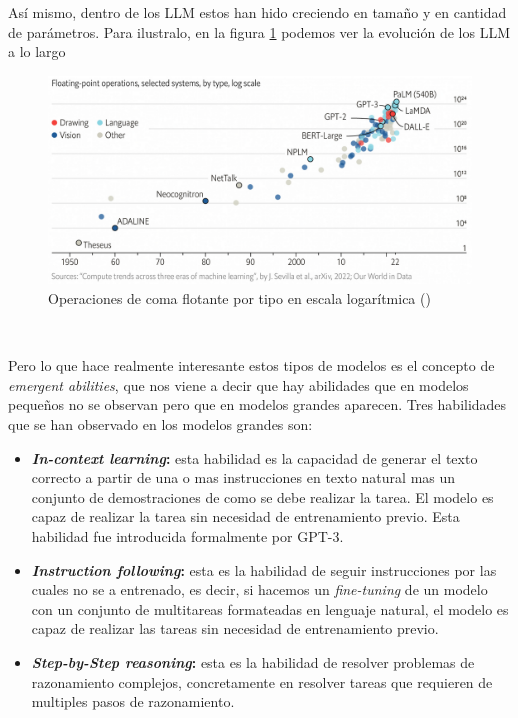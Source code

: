 Así mismo, dentro de los LLM estos han hido creciendo en tamaño y en cantidad de parámetros.
Para ilustralo, en la figura \ref{fig:evolutionLLM} podemos ver la evolución de los LLM a lo largo

\begin{figure}[H]
    \begin{center}
      \includegraphics[width=15cm]{figuras/Capitulo_09/EvolutionLLM.png}
    \end{center}
    \caption[Operaciones de coma flotante por tipo en escala logarítmica]{Operaciones de coma flotante por tipo en escala logarítmica (\cite{EvolutionLLM})}
    \label{fig:evolutionLLM}
\end{figure}\

Pero lo que hace realmente interesante estos tipos de modelos es el concepto de
\textit{emergent abilities}, que nos viene a decir que hay abilidades que en 
modelos pequeños no se observan pero que en modelos grandes aparecen. Tres
habilidades que se han observado en los modelos grandes son:

\begin{itemize}
    \item \textbf{\textit{In-context learning}:} esta habilidad es la capacidad
        de generar el texto correcto a partir de una o mas instrucciones en texto
        natural mas un conjunto de demostraciones de como se debe realizar la tarea.
        El modelo es capaz de realizar la tarea sin necesidad de entrenamiento previo.
        Esta habilidad fue introducida formalmente por GPT-3.
    \item \textbf{\textit{Instruction following}:} esta es la habilidad de seguir
        instrucciones por las cuales no se a entrenado, es decir, si hacemos un 
        \textit{fine-tuning} de un modelo con un conjunto de multitareas formateadas en
        lenguaje natural, el modelo es capaz de realizar las tareas sin necesidad de
        entrenamiento previo.
    \item \textbf{\textit{Step-by-Step reasoning}:} esta es la habilidad de resolver
        problemas de razonamiento complejos, concretamente en resolver tareas que
        requieren de multiples pasos de razonamiento.
\end{itemize}

